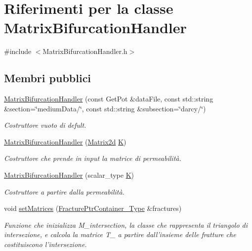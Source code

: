 \hypertarget{classMatrixBifurcationHandler}{\section{Riferimenti per la classe Matrix\-Bifurcation\-Handler}
\label{classMatrixBifurcationHandler}
}


{\ttfamily \#include $<$Matrix\-Bifurcation\-Handler.\-h$>$}

\subsection*{Membri pubblici}
\begin{DoxyCompactItemize}
\item 
\hyperlink{classMatrixBifurcationHandler_a57f9791749acd9b699bf737193c2e87a}{Matrix\-Bifurcation\-Handler} (const Get\-Pot \&data\-File, const std\-::string \&section=\char`\"{}medium\-Data/\char`\"{}, const std\-::string \&subsection=\char`\"{}darcy/\char`\"{})
\begin{DoxyCompactList}\small\item\em Costruttore vuoto di defult. \end{DoxyCompactList}\item 
\hyperlink{classMatrixBifurcationHandler_ad65c01c578ef41e0513e6915cadb068e}{Matrix\-Bifurcation\-Handler} (\hyperlink{Core_8h_a1694976dd66ed00e5f0618f4f8821163}{Matrix2d} \hyperlink{classMatrixBifurcationHandler_ac7d63c6d730079862dd8238928d94b26}{K})
\begin{DoxyCompactList}\small\item\em Costruttore che prende in input la matrice di permeabilità. \end{DoxyCompactList}\item 
\hyperlink{classMatrixBifurcationHandler_a86e7580758aa9a2ec5ef4285e70d06bf}{Matrix\-Bifurcation\-Handler} (scalar\-\_\-type \hyperlink{classMatrixBifurcationHandler_ac7d63c6d730079862dd8238928d94b26}{K})
\begin{DoxyCompactList}\small\item\em Costruttore a partire dalla permeabilità. \end{DoxyCompactList}\item 
void \hyperlink{classMatrixBifurcationHandler_a94433cf28ec2af6ba06b7f63a081d787}{set\-Matrices} (\hyperlink{FractureHandler_8h_a2f0b57e18ecf89912d7de0c87158009e}{Fracture\-Ptr\-Container\-\_\-\-Type} \&fractures)
\begin{DoxyCompactList}\small\item\em Funzione che inizializza M\-\_\-intersection, la classe che rappresenta il triangolo di intersezione, e calcola la matrice T\-\_\- a partire dall'insieme delle fratture che costituiscono l'intersezione. \end{DoxyCompactList}\item 

\end{DoxyCompactItemize}
